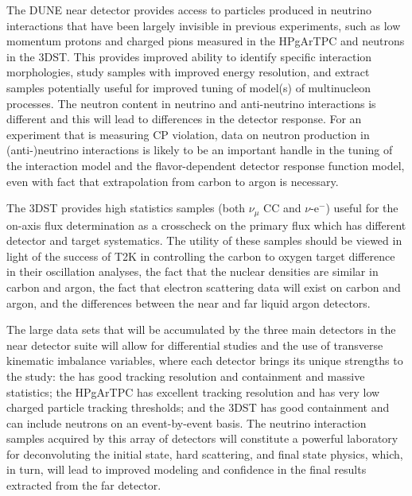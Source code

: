 The DUNE near detector provides access to particles produced in neutrino interactions that have been largely invisible in previous experiments, such as low momentum protons and charged pions measured in the HPgArTPC and neutrons in the 3DST. This provides improved ability to identify specific interaction morphologies, study samples with improved energy resolution, and extract samples potentially useful for improved tuning of model(s) of multinucleon processes. The neutron content in neutrino and anti-neutrino interactions is different and this will lead to differences in the detector response. For an experiment that is measuring CP violation, data on neutron production in (anti-)neutrino interactions is likely to be an important handle in the tuning of the interaction model and the flavor-dependent detector response function model, even with fact that extrapolation from carbon to argon is necessary.  

The 3DST provides high statistics samples (both $\nu_{\mu}$ CC and $\nu$-e$^{-}$) useful for the on-axis flux determination as a crosscheck on the primary flux which has different detector and target systematics.  The utility of these samples should be viewed in light of the success of T2K in controlling the carbon to oxygen target difference in their oscillation analyses, the fact that the nuclear densities are similar in carbon and argon, the fact that electron scattering data will exist on carbon and argon, and the differences between the near and far liquid argon detectors.

The large data sets that will be accumulated by the three main detectors in the near detector suite will allow for differential studies and the use of transverse kinematic imbalance variables, where each detector brings its unique strengths to the study: the  has good tracking resolution and containment and massive statistics; the HPgArTPC has excellent tracking resolution and has very low charged particle tracking thresholds; and the 3DST has good containment and can include neutrons on an event-by-event basis. The neutrino interaction samples acquired by this array of detectors will constitute a powerful laboratory for deconvoluting the initial state, hard scattering, and final state physics, which, in turn, will lead to improved modeling and confidence in the final results extracted from the far detector.  




